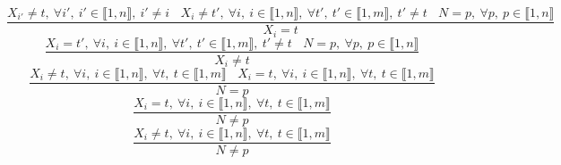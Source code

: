 $$\frac{X_{i'} \neq t,~\forall i',~i' \in \llbracket1,n\rrbracket,~i' \neq i~~~~X_{i} \neq t',~\forall i,~i \in \llbracket1,n\rrbracket,~\forall t',~t' \in \llbracket1,m\rrbracket,~t' \neq t~~~~N=p,~\forall p,~p \in \llbracket1,n\rrbracket}{X_{i}=t}$$ $$\frac{X_{i}=t',~\forall i,~i \in \llbracket1,n\rrbracket,~\forall t',~t' \in \llbracket1,m\rrbracket,~t' \neq t~~~~N=p,~\forall p,~p \in \llbracket1,n\rrbracket}{X_{i} \neq t}$$ $$\frac{X_{i} \neq t,~\forall i,~i \in \llbracket1,n\rrbracket,~\forall t,~t \in \llbracket1,m\rrbracket~~~~X_{i}=t,~\forall i,~i \in \llbracket1,n\rrbracket,~\forall t,~t \in \llbracket1,m\rrbracket}{N=p}$$ $$\frac{X_{i}=t,~\forall i,~i \in \llbracket1,n\rrbracket,~\forall t,~t \in \llbracket1,m\rrbracket}{N \neq p}$$ $$\frac{X_{i} \neq t,~\forall i,~i \in \llbracket1,n\rrbracket,~\forall t,~t \in \llbracket1,m\rrbracket}{N \neq p}$$ 